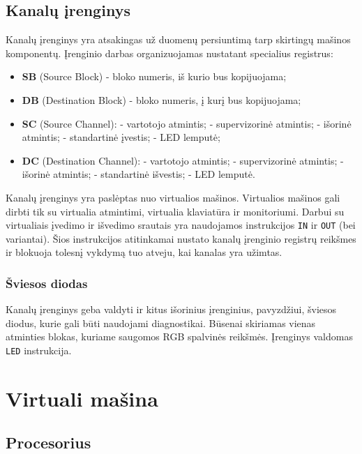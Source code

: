 \documentclass{scrartcl}
\begin{document}
        \subsection{Kanalų įrenginys}
            Kanalų įrenginys yra atsakingas už duomenų persiuntimą tarp skirtingų mašinos komponentų. Įrenginio darbas organizuojamas nustatant specialius registrus:
            \begin{itemize}
                \item \textbf{SB} (Source Block) - bloko numeris, iš kurio bus kopijuojama;
                \item \textbf{DB} (Destination Block) - bloko numeris, į kurį bus kopijuojama;
                \item \textbf{SC} (Source Channel):
                     - vartotojo atmintis;
                     - supervizorinė atmintis;
                     - išorinė atmintis;
                     - standartinė įvestis;
                     - LED lemputė;
                \item \textbf{DC} (Destination Channel):
                     - vartotojo atmintis;
                     - supervizorinė atmintis;
                     - išorinė atmintis;
                     - standartinė išvestis;
                     - LED lemputė.
            \end{itemize}
            Kanalų įrenginys yra paslėptas nuo virtualios mašinos. Virtualios mašinos gali dirbti tik su virtualia atmintimi, virtualia klaviatūra ir monitoriumi. Darbui su virtualiais įvedimo ir išvedimo srautais yra naudojamos instrukcijos \texttt{IN} ir \texttt{OUT} (bei variantai). Šios instrukcijos atitinkamai nustato kanalų įrenginio registrų reikšmes ir blokuoja tolesnį vykdymą tuo atveju, kai kanalas yra užimtas.
            \subsubsection{Šviesos diodas}
                Kanalų įrenginys geba valdyti ir kitus išorinius įrenginius, pavyzdžiui, šviesos diodus, kurie gali būti naudojami diagnostikai. Būsenai skiriamas vienas atminties blokas, kuriame saugomos RGB spalvinės reikšmės. Įrenginys valdomas \texttt{LED} instrukcija.
    \pagebreak
    \section{Virtuali mašina}
        \subsection{Procesorius}
\end{document}
